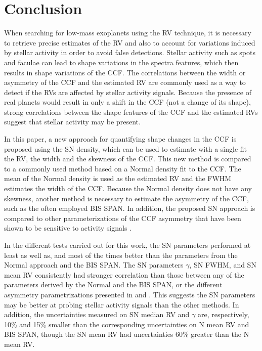 \documentclass{aa}
\begin{document}
\section{Conclusion} \label{sec:conclu}

When searching for low-mass exoplanets using the RV technique, it is necessary to retrieve precise estimates of the RV and also to account for variations induced by stellar activity in order to avoid false detections.  
Stellar activity such as spots and faculae can lead to shape variations in the spectra features, which then results in shape variations of the CCF.
The correlations between the width or asymmetry of the CCF and the estimated RV are commonly used as a way to detect if the RVs are affected by stellar activity signals.   
Because the presence of real planets would result in only a shift in the CCF (not a change of its shape), strong correlations between the shape features of the CCF and the estimated RVs suggest that stellar activity may be present.



In this paper, a new approach for quantifying shape changes in the CCF is proposed using the SN density, which can be used to estimate with a single fit the RV, the width and the skewness of the CCF. 
This new method is compared to a commonly used method based on a Normal density fit to the CCF.  The mean of the Normal density is used as the estimated RV and the FWHM estimates the width of the CCF.  Because the Normal density does not have any skewness, another method is necessary to estimate the asymmetry of the CCF, such as the often employed BIS SPAN.
In addition, the proposed SN approach is compared to other parameterizations of the CCF asymmetry that have been shown to be sensitive to activity signals \citep[][]{Boisse-2011,Figueira-2013}.

In the different tests carried out for this work, the SN parameters performed at least as well as, and most of the times better than the parameters from the Normal approach and the BIS SPAN.
The SN parameters $\gamma$, SN FWHM, and SN mean RV consistently had stronger correlation than those between any of the parameters derived by the Normal and the BIS SPAN, or the different asymmetry parametrizations presented in \citet{Boisse-2011} and \citet{Figueira-2013}. 
This suggests the SN parameters may be better at probing stellar activity signals than the other methods. 
In addition, the uncertainties measured on SN median RV and $\gamma$ are, respectively, 10\% and 15\% smaller than the corresponding uncertainties on N mean RV and BIS SPAN, though the SN mean RV had uncertainties 60\% greater than the N mean RV.
\end{document}
